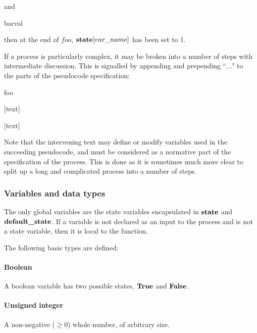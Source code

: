 and 

\begin{pseudo}{bar}{val}
\end{pseudo}

then at the end of $foo$, $\textbf{state}[var\_name]$ has been set to 1.

If a process is particularly complex, it may be broken into a number of steps with 
intermediate discussion. This is signalled by appending  and prepending ``$\hdots$" to
the parts of the pseudocode specification:

\begin{pseudo}{foo}{}
\bsCODE{\hdots}
\end{pseudo}

[text]

\begin{pseudo*}
\bsCODE{\hdots}
\end{pseudo*}

[text]

\begin{pseudo*}
\end{pseudo*}

Note that the intervening text may define or modify variables used in the succeeding
pseudocode, and must be considered as a normative part of the specification of the process.
This is done as it is sometimes much more clear to split up a long and complicated process
into a number of steps.

\subsubsection{Variables and data types}
\label{datatypes}

The only global variables are the state variables encapsulated in $\textbf{state}$
and $\textbf{default\_state}$. If a variable is not declared as an input to
the process and is not a state variable, then it is local to the function.

The following basic types are defined:

\paragraph*{Boolean} A boolean variable has two possible states, $\text{\bf{True}}$ and $\text{\bf{False}}$.

\paragraph*{Unsigned integer} A non-negative ($\geq 0$) whole number, of arbitrary size.

